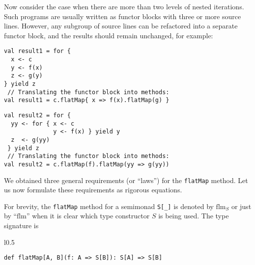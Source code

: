 Now consider the case when there are more than two levels of nested
iterations. Such programs are usually written as functor blocks with
three or more source lines. However, any subgroup of source lines
can be refactored into a separate functor block, and the results should
remain unchanged, for example:

\vspace{0.3\baselineskip}

\noindent \texttt{\textcolor{blue}{\footnotesize{}}}%
\begin{minipage}[c]{0.475\columnwidth}%
\begin{lstlisting}
val result1 = for {
  x <- c
  y <- f(x)
  z <- g(y)
} yield z
 // Translating the functor block into methods:
val result1 = c.flatMap{ x => f(x).flatMap(g) }
\end{lstlisting}
%
\end{minipage}\texttt{\textcolor{blue}{\footnotesize{}\hspace*{\fill}}}%
\begin{minipage}[c]{0.475\columnwidth}%
\begin{lstlisting}
val result2 = for {
  yy <- for { x <- c
              y <- f(x) } yield y
  z  <- g(yy)
 } yield z
 // Translating the functor block into methods:
val result2 = c.flatMap(f).flatMap(yy => g(yy))
\end{lstlisting}
%
\end{minipage}\vspace{0\baselineskip}

We obtained three general requirements (or \textsf{``}laws\textsf{''}) for the \lstinline!flatMap!
method. Let us now formulate these requirements as rigorous equations.

For brevity, the \lstinline!flatMap! method for a semimonad \lstinline!S[_]!
is denoted by $\text{flm}_{S}$ or just by \textsf{``}$\text{flm}$\textsf{''} when
it is clear which type constructor $S$ is being used. The type signature
is

\begin{wrapfigure}{l}{0.5\columnwidth}%
\vspace{-0.9\baselineskip}

\begin{lstlisting}
def flatMap[A, B](f: A => S[B]): S[A] => S[B] 
\end{lstlisting}

\vspace{-0.5\baselineskip}
\end{wrapfigure}%

